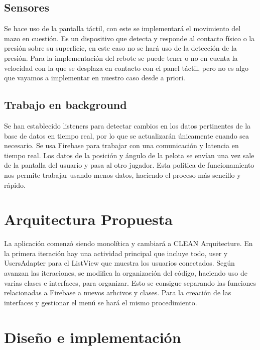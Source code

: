 \documentclass[a4paper,openright,12pt]{article}
\begin{document}
\subsection{Sensores}
Se hace uso de la pantalla táctil, con este se implementará el movimiento del mazo en cuestión. Es un dispositivo que detecta y responde al contacto físico o la presión sobre su superficie, en este caso no se hará uso de la detección de la presión. Para la implementación del rebote se puede tener o no en cuenta la velocidad con la que se desplaza en contacto con el panel táctil, pero no es algo que vayamos a implementar en nuestro caso desde a priori.

\subsection{Trabajo en background}
Se han establecido listeners para detectar cambios en los datos pertinentes de la base de datos en tiempo real, por lo que se actualizarán únicamente cuando sea necesario. Se usa Firebase para trabajar con una comunicación y latencia en tiempo real. Los datos de la posición y ángulo de la pelota se envían una vez sale de la pantalla del usuario y pasa al otro jugador. Esta política de funcionamiento nos permite trabajar usando menos datos, haciendo el proceso más sencillo y rápido. 

\section{Arquitectura Propuesta}
La aplicación comenzó siendo monolítica y cambiará a CLEAN Arquitecture. En la primera iteración hay una actividad principal que incluye todo, user y UsersAdapter para el ListView que muestra los usuarios conectados. Según avanzan las iteraciones, se modifica la organización del código, haciendo uso de varias clases e interfaces, para organizar. Esto se consigue separando las funciones relacionadas a Firebase a nuevos arhcivos y clases. Para la creación de las interfaces y gestionar el menú se hará el mismo procedimiento.

\section{Diseño e implementación}
\end{document}
